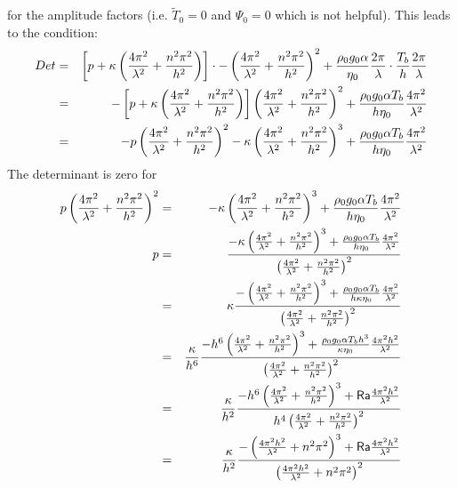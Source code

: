 for the amplitude factors (i.e. $\tilde{T}_0=0$ and $\Psi_0=0$ which is not helpful).
This leads to the condition: 
\begin{eqnarray}
Det &=& 
\left[ p  + \kappa \left(\frac{4\pi^2}{\lambda^2} + \frac{n^2\pi^2}{h^2}\right)  \right]
\cdot 
-\left( \frac{4\pi^2}{\lambda^2} + \frac{n^2\pi^2}{h^2} \right)^2
+
\frac{\rho_0 g_0 \alpha}{\eta_0}  \frac{2 \pi }{\lambda} 
\cdot
\frac{T_b}{h}   \frac{2 \pi}{\lambda}  \nonumber\\
&=& -\left[ p  + \kappa \left(\frac{4\pi^2}{\lambda^2} + \frac{n^2\pi^2}{h^2}\right)  \right]
\left( \frac{4\pi^2}{\lambda^2} + \frac{n^2\pi^2}{h^2} \right)^2
+
\frac{\rho_0 g_0 \alpha T_b}{ h\eta_0}  \frac{4 \pi^2 }{\lambda^2}      \nonumber\\
&=&
- p  \left( \frac{4\pi^2}{\lambda^2} + \frac{n^2\pi^2}{h^2} \right)^2
- \kappa \left(\frac{4\pi^2}{\lambda^2} + \frac{n^2\pi^2}{h^2}\right)^3  
+ \frac{\rho_0 g_0 \alpha T_b}{ h\eta_0}  \frac{4 \pi^2 }{\lambda^2}     \nonumber
\end{eqnarray}
The determinant is zero for  
\begin{eqnarray}
p  \left( \frac{4\pi^2}{\lambda^2} + \frac{n^2\pi^2}{h^2} \right)^2
&=&
- \kappa \left(\frac{4\pi^2}{\lambda^2} + \frac{n^2\pi^2}{h^2}\right)^3  
+ \frac{\rho_0 g_0 \alpha T_b}{ h\eta_0}  \frac{4 \pi^2 }{\lambda^2}     \nonumber\\
p 
&=& \frac{
-\kappa \left(\frac{4\pi^2}{\lambda^2} + \frac{n^2\pi^2}{h^2}\right)^3  
+ \frac{\rho_0 g_0 \alpha T_b}{ h\eta_0}  \frac{4 \pi^2 }{\lambda^2}  }
{\left( \frac{4\pi^2}{\lambda^2} + \frac{n^2\pi^2}{h^2} \right)^2} \nonumber\\
&=& \kappa \frac{
-\left(\frac{4\pi^2}{\lambda^2} + \frac{n^2\pi^2}{h^2}\right)^3  
+ \frac{\rho_0 g_0 \alpha T_b}{ h \kappa \eta_0}  \frac{4 \pi^2 }{\lambda^2}  }
{\left( \frac{4\pi^2}{\lambda^2} + \frac{n^2\pi^2}{h^2} \right)^2} \nonumber\\
&=& \frac{ \kappa }{h^6}\frac{ -h^6
\left(  \frac{4\pi^2}{\lambda^2} + \frac{n^2\pi^2}{h^2}\right)^3  
+ \frac{\rho_0 g_0 \alpha T_b h^3}{  \kappa \eta_0}  \frac{4 \pi^2 h^2}{\lambda^2}  }
{  \left( \frac{4\pi^2}{\lambda^2} + \frac{n^2\pi^2}{h^2} \right)^2} \nonumber\\
&=& \frac{ \kappa }{h^2} \frac{- h^6 \left( \frac{4\pi^2}{\lambda^2} + \frac{n^2\pi^2}{h^2}\right)^3  
+ {\mathsf{Ra}} \frac{4 \pi^2 h^2}{\lambda^2}  }
{ h^4  \left( \frac{4\pi^2}{\lambda^2} + \frac{n^2\pi^2}{h^2} \right)^2} \nonumber\\
&=& \frac{ \kappa }{h^2} \frac{ 
-\left( \frac{4\pi^2 h^2}{\lambda^2} + n^2\pi^2 \right)^3  
+ {\mathsf{Ra}} \frac{4 \pi^2 h^2}{\lambda^2}  }
{   \left( \frac{4\pi^2 h^2}{\lambda^2} + n^2\pi^2 \right)^2} 
\end{eqnarray}

